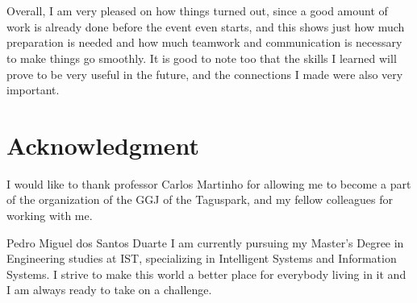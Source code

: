 \documentclass[a4paper,12pt,journal,twoside,compsoc]{PPIEEEtran}
\begin{document}
\section{}
\label{concl}
Overall, I am very pleased on how things turned out, since a good amount of work is already done before the event even starts, and this shows just how much preparation is needed and how much teamwork and communication is necessary to make things go smoothly. It is good to note too that the skills I learned will prove to be very useful in the future, and the connections I made were also very important.
\ifCLASSOPTIONcompsoc
  \section*{} %
\else
  \section*{Acknowledgment}
\fi

I would like to thank professor Carlos Martinho for allowing me to become a part of the organization of the \ac{GGJ} of the Taguspark, and my fellow colleagues for working with me.


%

% 

\begin{IEEEbiography}{Pedro Miguel dos Santos Duarte}
I am currently pursuing my Master's Degree in Engineering studies at \ac{IST}, specializing in Intelligent Systems and Information Systems. I strive to make this world a better place for everybody living in it and I am always ready to take on a challenge.
\end{IEEEbiography}


	
\end{document}
